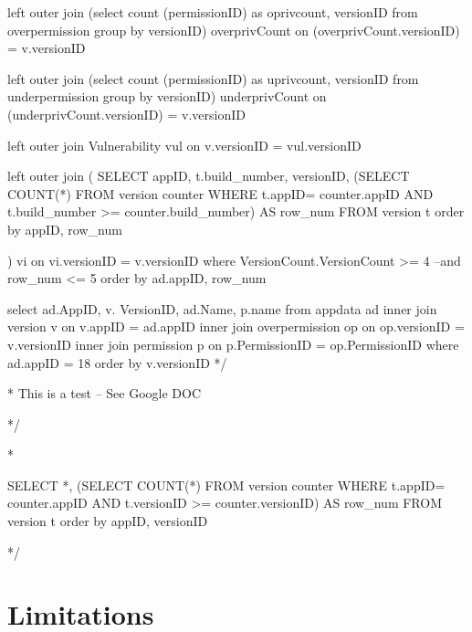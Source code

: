 \documentclass{sig-alternate}
\begin{document}
left outer join (select count (permissionID) as oprivcount, versionID from overpermission group by versionID) overprivCount on (overprivCount.versionID) = v.versionID

left outer join (select count (permissionID) as uprivcount, versionID from underpermission group by versionID) underprivCount on (underprivCount.versionID) = v.versionID

left outer join Vulnerability vul on v.versionID = vul.versionID

left outer join
(
	SELECT appID, t.build_number, versionID, (SELECT COUNT(*) FROM version counter
           WHERE t.appID= counter.appID AND t.build_number >= counter.build_number) AS row_num
	FROM version t
	order by appID, row_num

) vi on vi.versionID = v.versionID
where VersionCount.VersionCount >= 4
--and row_num <= 5
order by ad.appID, row_num






%	


select ad.AppID, v. VersionID, ad.Name, p.name
from appdata ad
inner join version v on v.appID = ad.appID
inner join overpermission op on op.versionID = v.versionID
inner join permission p on p.PermissionID = op.PermissionID
where ad.appID = 18
order by v.versionID
*/

\/* This is a test
-- See Google DOC

*/




\/*

SELECT *, (SELECT COUNT(*) FROM version counter
           WHERE t.appID= counter.appID AND t.versionID >= counter.versionID) AS row_num
FROM version t
order by appID, versionID








*/

\section{Limitations}
\label{sec: limitations}

\end{document}
